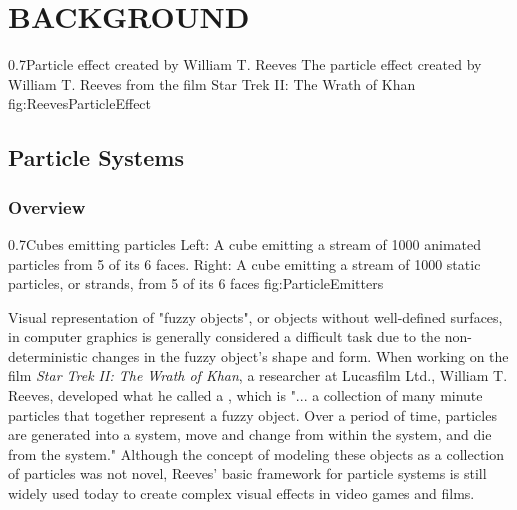 
\chapter{BACKGROUND}\label{ch:background}

{0.7}{Particle effect created by William T. Reeves}
{The particle effect created by William T. Reeves from the film Star Trek II: The Wrath of Khan}
{fig:ReevesParticleEffect}

\section{Particle Systems}\label{sec:particle_systems}

\subsection{Overview}\label{ssec:particle_systems_overview}

{0.7}{Cubes emitting particles}
{Left: A cube emitting a stream of 1000 animated particles from 5 of its 6 faces. Right: A cube emitting a stream of 1000 static particles, or strands, from 5 of its 6 faces}
{fig:ParticleEmitters}

Visual representation of "fuzzy objects", or objects without well-defined surfaces, in computer graphics is generally considered a difficult task due to the non-deterministic changes in the fuzzy object's shape and form. When working on the film \textit{Star Trek II: The Wrath of Khan}, a researcher at Lucasfilm Ltd., William T. Reeves, developed what he called a , which is "... a collection of many minute particles that together represent a fuzzy object. Over a period of time, particles are generated into a system, move and change from within the system, and die from the system." \cite{Reeves1983ParticleSystems} Although the concept of modeling these objects as a collection of particles was not novel, Reeves' basic framework for particle systems is still widely used today to create complex visual effects in video games and films.

